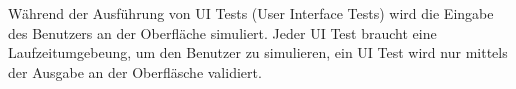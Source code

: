 Während der Ausführung von UI Tests (User Interface Tests) wird die Eingabe des Benutzers an der Oberfläche simuliert.
Jeder UI Test braucht eine Laufzeitumgebeung, um den Benutzer zu simulieren, 
ein UI Test wird nur mittels der Ausgabe an der Oberfläsche validiert.